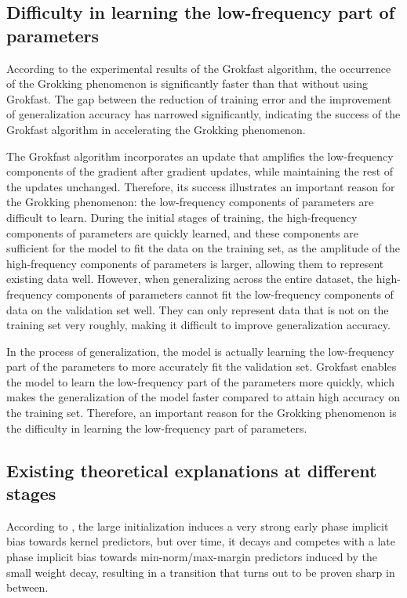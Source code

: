 \documentclass[UTF8]{article}
\begin{document}
\subsection{Difficulty in learning the low-frequency part of parameters}

According to the experimental results of the Grokfast algorithm, 
the occurrence of the Grokking phenomenon is significantly faster than 
that without using Grokfast. The gap between the reduction of training 
error and the improvement of generalization accuracy has narrowed significantly, 
indicating the success of the Grokfast algorithm in accelerating the 
Grokking phenomenon.


The Grokfast algorithm incorporates an update that amplifies 
the low-frequency components of the gradient after gradient updates, 
while maintaining the rest of the updates unchanged. Therefore, 
its success illustrates an important reason for the Grokking phenomenon: 
the low-frequency components of parameters are difficult to learn. 
During the initial stages of training, the high-frequency components of 
parameters are quickly learned, and these components are sufficient for 
the model to fit the data on the training set, as the amplitude of the 
high-frequency components of parameters is larger, allowing them 
to represent existing data well. However, when generalizing across the 
entire dataset, the high-frequency components of parameters cannot fit 
the low-frequency components of data on the validation set well. 
They can only represent data that is not on the training set very roughly, 
making it difficult to improve generalization accuracy.


In the process of generalization, the model is actually learning the 
low-frequency part of the parameters to more accurately fit the validation set. 
Grokfast enables the model to learn the low-frequency part of the parameters more quickly, 
which makes the generalization of the model faster compared to attain high accuracy 
on the training set. Therefore, an important reason for the Grokking phenomenon is 
the difficulty in learning the low-frequency part of parameters.


\subsection{Existing theoretical explanations at different stages}


According to \cite{lyu2023dichotomy}, the large initialization induces a very strong early phase implicit 
bias towards kernel predictors, but over time, it decays and competes with a late phase 
implicit bias towards min-norm/max-margin predictors induced by the small weight decay, 
resulting in a transition that turns out to be proven sharp in between. 
\end{document}
